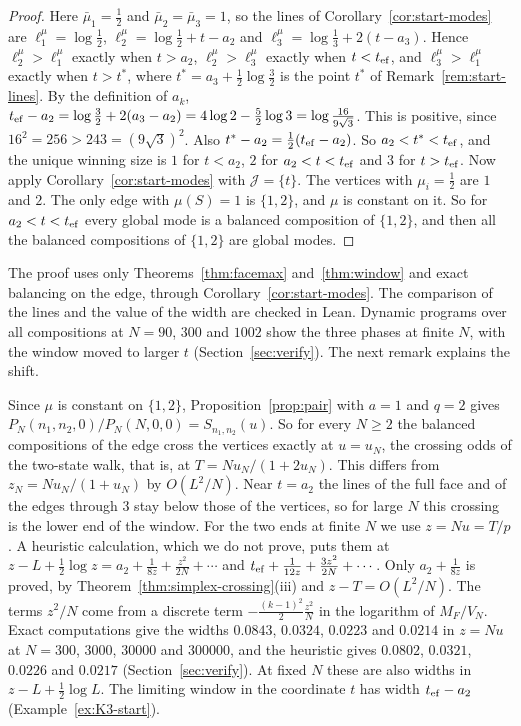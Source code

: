 \begin{proof}
Here $\bar\mu_1=\frac12$ and $\bar\mu_2=\bar\mu_3=1$, so the lines of
Corollary~\ref{cor:start-modes} are $\ell^\mu_1=\log\frac12$,
$\ell^\mu_2=\log\frac12+t-a_2$ and $\ell^\mu_3=\log\frac13+2(t-a_3)$. Hence
$\ell^\mu_2>\ell^\mu_1$ exactly when $t>a_2$, $\ell^\mu_2>\ell^\mu_3$ exactly
when $t<t_{\rm ef}$, and $\ell^\mu_3>\ell^\mu_1$ exactly when $t>t^*$, where
$t^*=a_3+\frac12\log\frac32$ is the point $t^*$ of
Remark~\ref{rem:start-lines}. By the definition of $a_k$,
$t_{\rm ef}-a_2=\log\frac32+2(a_3-a_2)=4\log2-\frac52\log3
=\log\frac{16}{9\sqrt3}$. This is positive, since
$16^2=256>243=(9\sqrt3)^2$. Also $t^*-a_2=\frac12(t_{\rm ef}-a_2)$. So
$a_2<t^*<t_{\rm ef}$, and the unique winning size is $1$ for $t<a_2$, $2$ for
$a_2<t<t_{\rm ef}$ and $3$ for $t>t_{\rm ef}$. Now apply
Corollary~\ref{cor:start-modes} with $\mathcal J=\{t\}$. The vertices with
$\mu_i=\frac12$ are $1$ and $2$. The only edge with $\mu(S)=1$ is $\{1,2\}$, and
$\mu$ is constant on it. So for $a_2<t<t_{\rm ef}$ every global mode is a
balanced composition of $\{1,2\}$, and then all the balanced compositions of $\{1,2\}$ are global modes.
\end{proof}

The proof uses only Theorems~\ref{thm:facemax} and~\ref{thm:window} and exact balancing on the
edge, through Corollary~\ref{cor:start-modes}. The comparison of the lines and the value of the
width are checked in Lean. Dynamic programs over all compositions at $N=90$, $300$ and $1002$ show the
three phases at finite $N$, with the window moved to larger $t$ (Section~\ref{sec:verify}). The
next remark explains the shift.

\begin{remark}\label{rem:K3-finite}
Since $\mu$ is constant on $\{1,2\}$, Proposition~\ref{prop:pair} with $a=1$ and $q=2$ gives
$P_N(n_1,n_2,0)/P_N(N,0,0)=S_{n_1,n_2}(u)$. So for every $N\ge2$ the balanced compositions of the edge
cross the vertices exactly at $u=u_N$, the crossing odds of the two-state walk, that is, at
$T=Nu_N/(1+2u_N)$. This differs from $z_N=Nu_N/(1+u_N)$ by $O(L^2/N)$. Near $t=a_2$ the lines
of the full face and of the edges through $3$ stay below those of the vertices, so for large $N$
this crossing is the lower end of the window. For the two ends at finite $N$ we use $z=Nu=T/p$.
A heuristic calculation, which we do not prove, puts them at
$z-L+\frac12\log z=a_2+\frac1{8z}+\frac{z^2}{2N}+\cdots$ and
$t_{\rm ef}+\frac1{12z}+\frac{3z^2}{2N}+\cdots$. Only $a_2+\frac1{8z}$ is proved, by
Theorem~\ref{thm:simplex-crossing}(iii) and $z-T=O(L^2/N)$. The terms $z^2/N$ come from a
discrete term $-\frac{(k-1)^2}2\frac{z^2}N$ in the logarithm of $M_F/V_N$. Exact computations
give the widths $0.0843$, $0.0324$, $0.0223$ and $0.0214$ in $z=Nu$ at $N=300$, $3000$,
$30000$ and $300000$, and the heuristic gives $0.0802$, $0.0321$, $0.0226$ and $0.0217$
(Section~\ref{sec:verify}). At fixed $N$ these are also widths in $z-L+\frac12\log L$.
The limiting window in the coordinate $t$ has width $t_{\rm ef}-a_2$
(Example~\ref{ex:K3-start}).
\end{remark}

